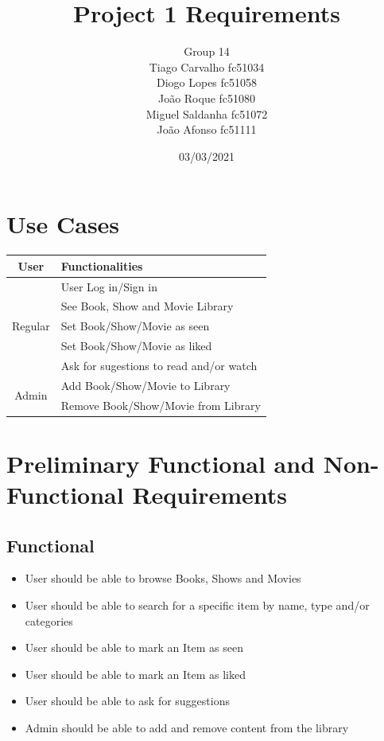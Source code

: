 \documentclass{article}
\title{Project 1 Requirements}
\author{Group 14 \\
Tiago Carvalho fc51034 \\
Diogo Lopes fc51058 \\
João Roque fc51080 \\
Miguel Saldanha fc51072 \\
João Afonso fc51111 \\
}
\date{03/03/2021}
\begin{document}
\maketitle

\section{Use Cases}
  \begin{table}[H]
    \centering
    \begin{tabular}{c|l} 
      User & Functionalities \\ \hline
      \multirow{5}{*}{ Regular } 
        & User Log in/Sign in \\
        & See Book, Show and Movie Library \\
        & Set Book/Show/Movie as seen \\
        & Set Book/Show/Movie as liked \\ 
        & Ask for sugestions to read and/or watch  \\ \hline
      \multirow{2}{*}{ Admin } 
        & Add Book/Show/Movie to Library \\
        & Remove Book/Show/Movie from Library
    \end{tabular}
  \end{table}

\section{Preliminary Functional and Non-Functional Requirements}
  
  \subsection{Functional}
    \begin{itemize}
      \item User should be able to browse Books, Shows and Movies
      \item User should be able to search for a specific item by name, type and/or categories
      \item User should be able to mark an Item as seen 
      \item User should be able to mark an Item as liked
      \item User should be able to ask for suggestions
      \item Admin should be able to add and remove content from the library
    \end{itemize}
\end{document}
